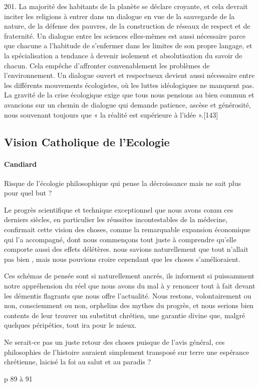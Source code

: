 \begin{singlequote}
        201. La majorité des habitants de la planète se déclare croyante, et cela devrait inciter les religions à entrer dans un dialogue en vue de la sauvegarde de la nature, de la défense des pauvres, de la construction de réseaux de respect et de fraternité. Un dialogue entre les sciences elles-mêmes est aussi nécessaire parce que chacune a l’habitude de s’enfermer dans les limites de son propre langage, et la spécialisation a tendance à devenir isolement et absolutisation du savoir de chacun. Cela empêche d’affronter convenablement les problèmes de l’environnement. Un dialogue ouvert et respectueux devient aussi nécessaire entre les différents mouvements écologistes, où les luttes idéologiques ne manquent pas. La gravité de la crise écologique exige que tous nous pensions au bien commun et avancions sur un chemin de dialogue qui demande patience, ascèse et générosité, nous souvenant toujours que « la réalité est supérieure à l’idée ».[143]
\end{singlequote}
        

\subsection{Vision Catholique de l'Ecologie}

\paragraph{Candiard}

Risque de l'écologie philosophique qui pense la décroissance mais ne sait plus pour quel but ? 

\cite{candiard_quelques_2022}
\begin{singlequote}
        Le progrès scientifique et technique exceptionnel que nous avons connu ces derniers siècles, en particulier les réussites incontestables de la médecine, confirmait cette vision des choses, comme la remarquable expansion économique qui l’a accompagné, dont nous commençons tout juste à comprendre qu’elle comporte aussi des effets délétères. nous savions naturellement que tout n’allait pas bien , mais nous pouvions croire cependant que les choses s’amélioraient.

        Ces schémas de pensée sont si naturellement ancrés, ils informent si puissamment notre appréhension du réel que nous avons du mal à y renoncer tout à fait devant les démentis flagrants que nous offre l’actualité. Nous restons, volontairement ou non, consciemment ou non, orphelins des mythes du progrès, et nous serions bien contents de leur trouver un substitut chrétien, une garantie divine que, malgré quelques péripéties, tout ira pour le mieux.

        Ne serait-ce pas un juste retour des choses puisque de l’avis général, ces philosophies de l’histoire auraient simplement transposé sur terre une espérance chrétienne, laicisé la foi au salut et au paradis ?

        p 89 à 91

\end{singlequote}

